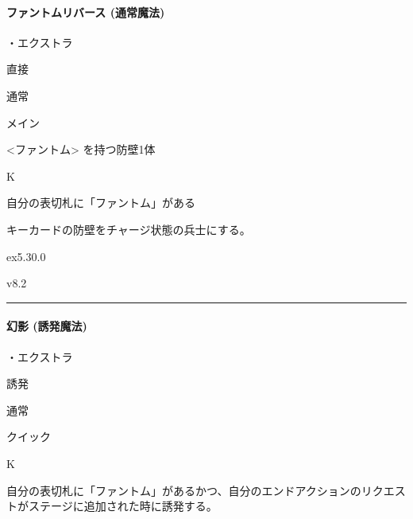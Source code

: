 \documentclass[letterpaper,10pt,dvipdfmx]{sphinxmanual}
\begin{document}
\paragraph{ファントムリバース (通常魔法)}
\label{\detokenize{auto/frameActionlist:act-phantomreverse}}\label{\detokenize{auto/frameActionlist:id40}}
\sphinxAtStartPar
{}

\sphinxAtStartPar
・エクストラ

\sphinxAtStartPar
{} 直接

\sphinxAtStartPar
{} 通常

\sphinxAtStartPar
{} メイン

\sphinxAtStartPar
{} \textless{}ファントム\textgreater{} を持つ防壁1体

\sphinxAtStartPar
{} K

\sphinxAtStartPar
{}

\sphinxAtStartPar
自分の表切札に「ファントム」がある

\sphinxAtStartPar
{}

\sphinxAtStartPar
キーカードの防壁をチャージ状態の兵士にする。

\sphinxAtStartPar
{}  ex5.30.0

\sphinxAtStartPar
{}  v8.2


\bigskip\hrule\bigskip



\paragraph{幻影 (誘発魔法)}
\label{\detokenize{auto/frameActionlist:act-illusion}}\label{\detokenize{auto/frameActionlist:id41}}
\sphinxAtStartPar
{}

\sphinxAtStartPar
・エクストラ

\sphinxAtStartPar
{} 誘発

\sphinxAtStartPar
{} 通常

\sphinxAtStartPar
{} クイック

\sphinxAtStartPar
{} K

\sphinxAtStartPar
{}

\sphinxAtStartPar
自分の表切札に「ファントム」があるかつ、自分のエンドアクションのリクエストがステージに追加された時に誘発する。
\end{document}
